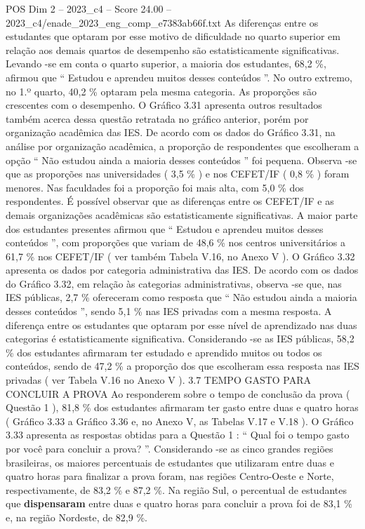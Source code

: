 \begin{textsample}{POS Dim 2 – 2023\_c4 – Score 24.00 – 2023\_c4/enade\_2023\_eng\_comp\_e7383ab66f.txt}
As diferenças entre os estudantes que optaram por esse motivo de dificuldade no quarto superior em relação aos demais quartos de desempenho são estatisticamente significativas.
Levando -se em conta o quarto superior, a maioria dos estudantes, 68,2 \%, afirmou que “ Estudou e aprendeu muitos desses conteúdos ”.
No outro extremo, no 1.º quarto, 40,2 \% optaram pela mesma categoria.
As proporções são crescentes com o desempenho.
O Gráfico 3.31 apresenta outros resultados também acerca dessa questão retratada no gráfico anterior, porém por organização acadêmica das IES.
De acordo com os dados do Gráfico 3.31, na análise por organização acadêmica, a proporção de respondentes que escolheram a opção “ Não estudou ainda a maioria desses conteúdos ” foi pequena.
Observa -se que as proporções nas universidades ( 3,5 \% ) e nos CEFET/IF ( 0,8 \% ) foram menores.
Nas faculdades foi a proporção foi mais alta, com 5,0 \% dos respondentes.
É possível observar que as diferenças entre os CEFET/IF e as demais organizações acadêmicas são estatisticamente significativas.
A maior parte dos estudantes presentes afirmou que “ Estudou e aprendeu muitos desses conteúdos ”, com proporções que variam de 48,6 \% nos centros universitários a 61,7 \% nos CEFET/IF ( ver também Tabela V.16, no Anexo V ).
O Gráfico 3.32 apresenta os dados por categoria administrativa das IES.
De acordo com os dados do Gráfico 3.32, em relação às categorias administrativas, observa -se que, nas IES públicas, 2,7 \% ofereceram como resposta que “ Não estudou ainda a maioria desses conteúdos ”, sendo 5,1 \% nas IES privadas com a mesma resposta.
A diferença entre os estudantes que optaram por esse nível de aprendizado nas duas categorias é estatisticamente significativa.
Considerando -se as IES públicas, 58,2 \% dos estudantes afirmaram ter estudado e aprendido muitos ou todos os conteúdos, sendo de 47,2 \% a proporção dos que escolheram essa resposta nas IES privadas ( ver Tabela V.16 no Anexo V ). 3.7 TEMPO GASTO PARA CONCLUIR A PROVA Ao responderem sobre o tempo de conclusão da prova ( Questão 1 ), 81,8 \% dos estudantes afirmaram ter gasto entre duas e quatro horas ( Gráfico 3.33 a Gráfico 3.36 e, no Anexo V, as Tabelas V.17 e V.18 ).
O Gráfico 3.33 apresenta as respostas obtidas para a Questão 1 : “ Qual foi o tempo gasto por você para concluir a prova? ”.
Considerando -se as cinco grandes regiões brasileiras, os maiores percentuais de estudantes que utilizaram entre duas e quatro horas para finalizar a prova foram, nas regiões Centro-Oeste e Norte, respectivamente, de 83,2 \% e 87,2 \%.
Na região Sul, o percentual de estudantes que \textbf{dispensaram} entre duas e quatro horas para concluir a prova foi de 83,1 \% e, na região Nordeste, de 82,9 \%.

\end{textsample}

